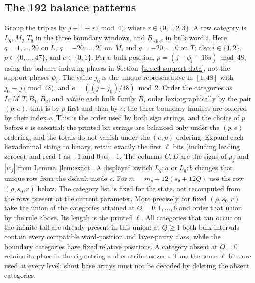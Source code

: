 \subsection{The 192 balance patterns}\label{sec:c4-balance-data-appendix}
Group the triples by $j-1\equiv r\pmod4$, where $r\in\{0,1,2,3\}$.
A row category is $L_q,M_q,T_q$ in the three boundary windows, and
$B_{i,p,e}$ in bulk word $i$.  Here
$q=1,\ldots,20$ on $L$, $q=-20,\ldots,20$ on $M$, and
$q=-20,\ldots,0$ on $T$; also $i\in\{1,2\}$,
$p\in\{0,\ldots,47\}$, and $e\in\{0,1\}$.  For a bulk position,
$p=(j-\phi_i-16s)\bmod48$, using the balance-indexing phases in
Section~\ref{sec:c4-support-data}, not the support phases $\psi_i$. The value $j_0$ is the unique representative in $[1,48]$
with $j_0\equiv j\pmod{48}$, and
$e=((j-j_0)/48)\bmod2$.  Order the categories as
$L,M,T,B_1,B_2$, and \emph{within} each bulk family $B_i$ order lexicographically by
the pair $(p,e)$, that is by $p$ first and then by $e$; the three boundary families are
ordered by their index $q$.  This is the order used by both
sign strings, and the choice of $p$ before $e$ is essential: the printed bit strings are
balanced only under the $(p,e)$ ordering, and the totals do not vanish under the
$(e,p)$ ordering.  Expand each hexadecimal string to binary, retain exactly the first
$\ell$ bits (including leading zeroes), and read $1$ as $+1$ and $0$ as $-1$.
The columns $C,D$ are the signs of $\mu_j$ and $|w_j|$ from
Lemma~\ref{lem:exact}.  A displayed switch $L_q:a$ or $L_q:b$ changes that unique
row from the default mode $c$.  For
$m=m_\rho+12(s_0+12Q)$ use the row $(\rho,s_0,r)$ below.
The category list is fixed for the state, not recomputed from the rows present at the current
parameter.  More precisely, for fixed $(\rho,s_0,r)$ take the union of the categories attained
at $Q=0,1,\ldots,6$ and order that union by the rule above.  Its length is the printed $\ell$.
All categories that can occur on the infinite tail are already present in this union: at $Q\ge1$
both bulk intervals contain every compatible word-position and layer-parity class, while the
boundary categories have fixed relative positions.  A category absent at $Q=0$ retains its place
in the sign string and contributes zero.  Thus the same $\ell$ bits are used at every level;
short base arrays must not be decoded by deleting the absent categories.
\begingroup\scriptsize
\setlength{\LTleft}{0pt}\setlength{\LTright}{0pt}
